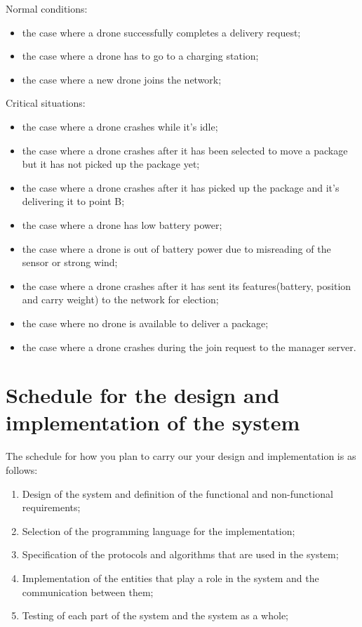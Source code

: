\documentclass[a4paper, oneside]{memoir}
\begin{document}
Normal conditions:
\begin{itemize}
	\item the case where a drone successfully completes a delivery request;
	\item the case where a drone has to go to a charging station;
	\item the case where a new drone joins the network;
\end{itemize}

Critical situations:
\begin{itemize}
	\item the case where a drone crashes while it's idle;
	\item the case where a drone crashes after it has been selected to move a package but it has not picked up the package yet;
	\item the case where a drone crashes after it has picked up the package and it's delivering it to point B;
	\item the case where a drone has low battery power;
	\item the case where a drone is out of battery power due to misreading of the sensor or strong wind;
	\item the case where a drone crashes after it has sent its features(battery, position and carry weight) to the network for election;
	\item the case where no drone is available to deliver a package;
	\item the case where a drone crashes during the join request to the manager server.
\end{itemize}


\section{Schedule for the design and implementation of the system}
The schedule for how you plan to carry our your design and implementation is as follows:
\begin{enumerate}
\item Design of the system and definition of the functional and non-functional requirements;
\item Selection of the programming language for the implementation;
\item Specification of the protocols and algorithms that are used in the system;
\item Implementation of the entities that play a role in the system and the communication between them;
\item Testing of each part of the system and the system as a whole;
\end{enumerate}
\end{document}
